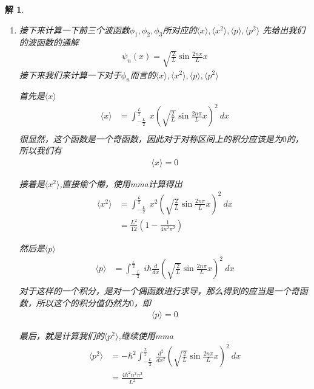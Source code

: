\documentclass{article}
\newtheorem{solution}{解}
\newcommand{\expectation}[1]{\langle #1 \rangle}
\begin{document}
\begin{solution}
\begin{enumerate}
    让$m\neq n$,可以得到
    \[ 
            \int_{-\frac{L}{2}}^{\frac{L}{2}} \sin\left(\frac{2m\pi}{L} x\right) \sin\left(\frac{2n\pi}{L} x\right) \, dx = 0 
    \] 
    综上，我们证明了
    \begin{equation*}
        \int dx \phi_n^{*}(x)\phi_m(x)=\delta_{nm}
    \end{equation*}

    \item[(3)] 接下来计算一下前三个波函数$\phi_1,\phi_2,\phi_3$所对应的$\expectation{x},\expectation{x^2},\expectation{p},\expectation{p^2}$
    先给出我们的波函数的通解
    \begin{align*}
        \psi_n(x)=\sqrt{\frac{2}{L}}\sin{\frac{2n\pi}{L}x}
    \end{align*}
    接下来我们来计算一下对于$\phi_n$而言的$\expectation{x},\expectation{x^2},\expectation{p},\expectation{p^2}$

    首先是$\expectation{x}$
    \begin{align*}
        \expectation{x}&=\int_{-\frac{L}{2}}^{\frac{L}{2}}\ x\left(\sqrt{\frac{2}{L}}\sin{\frac{2n\pi}{L}x}\right)^2\ dx\\
    \end{align*}
    很显然，这个函数是一个奇函数，因此对于对称区间上的积分应该是为$0$的，所以我们有
    \begin{align*}
        \expectation{x}=0
    \end{align*}

    接着是$\expectation{x^2}$,直接偷个懒，使用mma计算得出
    \begin{align*}
        \expectation{x^2}&=\int_{-\frac{L}{2}}^{\frac{L}{2}}\ x^2\left(\sqrt{\frac{2}{L}}\sin{\frac{2n\pi}{L}x}\right)^2\ dx\\
        &=\frac{L^2}{12}\left(1-\frac{1}{4n^2\pi^2}\right)
    \end{align*}

    然后是$\expectation{p}$
    \begin{align*}
        \expectation{p}&=\int_{-\frac{L}{2}}^{\frac{L}{2}}\ i\hbar\frac{d}{dx}\left(\sqrt{\frac{2}{L}}\sin{\frac{2n\pi}{L}x}\right)^2\ dx\\
    \end{align*}
    对于这样的一个积分，是对一个偶函数进行求导，那么得到的应当是一个奇函数，所以这个的积分值仍然为$0$，即
    \begin{align*}
        \expectation{p}=0
    \end{align*}

    最后，就是计算我们的$\expectation{p^2}$,继续使用mma
    \begin{align*}
        \expectation{p^2}&=-\hbar^2\int_{-\frac{L}{2}}^{\frac{L}{2}}\ \frac{d^2}{dx^2}\left(\sqrt{\frac{2}{L}}\sin{\frac{2n\pi}{L}x}\right)^2\ dx\\
        &=\frac{4\hbar^2n^2\pi^2}{L^2}
    \end{align*}


\end{enumerate}
\end{solution}
\end{document}
